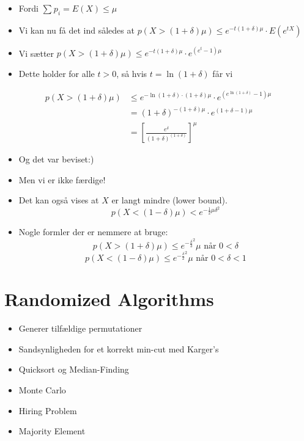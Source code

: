 \documentclass[11pt]{article}
\theoremstyle{definition}
\theoremstyle{remark}
\begin{document}
\begin{itemize}
\item Fordi $\sum_{}^{}p_{i} = E(X) \leq \mu$
\item Vi kan nu få det ind således at $p(X > (1 + \delta) \mu) \leq e^{-t(1 + \delta) \mu} \cdot E(e^{tX})$
\item Vi sætter $p(X > (1+\delta)\mu) \leq e^{-t (1+\delta) \mu} \cdot e^{(e^{t}-1)\mu}$
\item Dette holder for alle $t > 0$, så hvis $t = \ln (1+ \delta)$ får vi 
\end{itemize}


\begin{equation*}
  \begin{split}
    p(X > (1 + \delta) \mu) &\leq e^{-\ln(1 + \delta) \cdot (1 + \delta) \mu} \cdot e^{(e^{\ln (1 + \delta)}-1) \mu}\\
                     &= (1+ \delta)^{-(1+ \delta) \mu} \cdot e^{(1 + \delta-1) \mu}\\
    &= \left[ \frac{e^{\delta}}{(1+\delta)^{(1+\delta)}} \right]^{\mu}
  \end{split}
\end{equation*}

\begin{itemize}
\item Og det var beviset:)
\item Men vi er ikke færdige!
\item Det kan også vises at $X$ er langt mindre (lower bound). \[ p(X < (1 - \delta) \mu) < e^{- \frac{1}{2}\mu \delta^{2}} \]
\item Nogle formler der er nemmere at bruge: \[ p(X > (1 + \delta) \mu) \leq e^{- \frac{\delta}{3}^{2}} \mu \text{ når } 0 < \delta \]
  \[ p(X < (1- \delta) \mu ) \leq e^{- \frac{\delta}{2}^{2}}\mu \text{ når } 0 < \delta < 1 \]
\end{itemize}






\newpage


\section{Randomized Algorithms}
\label{sec:random}

\begin{itemize}
  \item Generer tilfældige permutationer
\item Sandsynligheden for et korrekt min-cut med Karger's
\item Quicksort og Median-Finding
\item Monte Carlo
\item Hiring Problem
\item Majority Element
\end{itemize}
\end{document}
